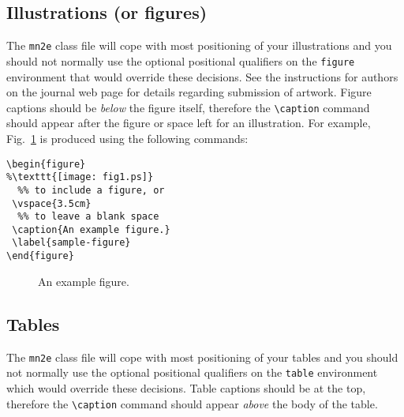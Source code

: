 \documentclass[useAMS,usenatbib]{mn2e}
\begin{document}

\subsection{Illustrations (or figures)}

The {\tt mn2e} class file will cope with most positioning of your
illustrations and you should not normally use the optional
positional qualifiers on the \verb"figure" environment that would
override these decisions. See the instructions for authors on the
journal web page for details regarding submission of artwork.
Figure captions should be \emph{below} the figure itself, therefore the
\verb"\caption" command should appear after the figure or space
left for an illustration. For example, Fig.~\ref{sample-figure} is
produced using the following commands:
%
\begin{verbatim}
\begin{figure}
%\texttt{[image: fig1.ps]}
  %% to include a figure, or
 \vspace{3.5cm}
  %% to leave a blank space
 \caption{An example figure.}
 \label{sample-figure}
\end{figure}
\end{verbatim}

\begin{figure}
 \vspace{3.5cm}
 \caption{An example figure.}
  \label{sample-figure}
\end{figure}

\subsection{Tables}

The {\tt mn2e} class file will cope with most positioning of your
tables and you should not normally use the optional positional
qualifiers on the \verb"table" environment which would override
these decisions. Table captions should be at the top, therefore
the \verb"\caption" command should appear \emph{above} the body of
the table.
\end{document}
